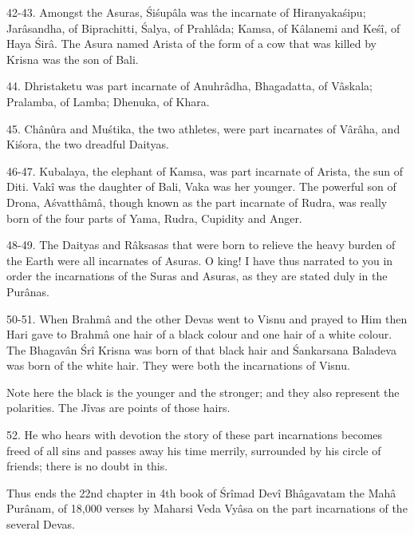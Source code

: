 42-43. Amongst the Asuras, \'Si\'sup\^ala was the incarnate of Hiranyaka\'sipu; Jar\^asandha, of Biprachitti, \'Salya, of Prahl\^ada; Kamsa, of K\^alanemi and Ke\'s\^i, of Haya \'Sir\^a. The Asura named Arista of the form of a cow that was killed by Krisna was the son of Bali.

44. Dhristaketu was part incarnate of Anuhr\^adha, Bhagadatta, of V\^askala; Pralamba, of Lamba; Dhenuka, of Khara.

45. Ch\^anûra and Mu\'stika, the two athletes, were part incarnates of V\^ar\^aha, and Ki\'sora, the two dreadful Daityas.

46-47. Kubalaya, the elephant of Kamsa, was part incarnate of Arista, the sun of Diti. Vak\^i was the daughter of Bali, Vaka was her younger. The powerful son of Drona, A\'svatth\^am\^a, though known as the part incarnate of Rudra, was really born of the four parts of Yama, Rudra, Cupidity and Anger.

48-49. The Daityas and R\^aksasas that were born to relieve the heavy burden of the Earth were all incarnates of Asuras. O king! I have thus narrated to you in order the incarnations of the Suras and Asuras, as they are stated duly in the Pur\^anas.

50-51. When Brahm\^a and the other Devas went to Visnu and prayed to Him then Hari gave to Brahm\^a one hair of a black colour and one hair of a white colour. The Bhagav\^an \'Sr\^i Krisna was born of that black hair and \'Sankarsana Baladeva was born of the white hair. They were both the incarnations of Visnu.

Note here the black is the younger and the stronger; and they also represent the polarities. The J\^ivas are points of those hairs.

52. He who hears with devotion the story of these part incarnations becomes freed of all sins and passes away his time merrily, surrounded by his circle of friends; there is no doubt in this.

Thus ends the 22nd chapter in 4th book of \'Sr\^imad Dev\^i Bh\^agavatam the Mah\^a Pur\^anam, of 18,000 verses by Maharsi Veda Vy\^asa on the part incarnations of the several Devas.